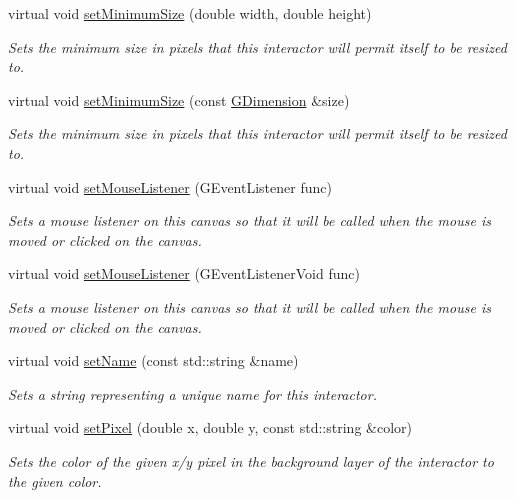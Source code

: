 \begin{DoxyCompactItemize}
virtual void \mbox{\hyperlink{classGInteractor_a0cf428e207b7f22cc08138a90b1b87b2}{set\+Minimum\+Size}} (double width, double height)
\begin{DoxyCompactList}\small\item\em Sets the minimum size in pixels that this interactor will permit itself to be resized to. \end{DoxyCompactList}\item 
virtual void \mbox{\hyperlink{classGInteractor_a3b1046117ac6cb7abe467e00ba8a81f4}{set\+Minimum\+Size}} (const \mbox{\hyperlink{classGDimension}{G\+Dimension}} \&size)
\begin{DoxyCompactList}\small\item\em Sets the minimum size in pixels that this interactor will permit itself to be resized to. \end{DoxyCompactList}\item 
virtual void \mbox{\hyperlink{classGCanvas_a37d8dbc943f59920f705b0104f60bde2}{set\+Mouse\+Listener}} (G\+Event\+Listener func)
\begin{DoxyCompactList}\small\item\em Sets a mouse listener on this canvas so that it will be called when the mouse is moved or clicked on the canvas. \end{DoxyCompactList}\item 
virtual void \mbox{\hyperlink{classGCanvas_aea7f647ea62d59f71b5fad6aa65eeaf9}{set\+Mouse\+Listener}} (G\+Event\+Listener\+Void func)
\begin{DoxyCompactList}\small\item\em Sets a mouse listener on this canvas so that it will be called when the mouse is moved or clicked on the canvas. \end{DoxyCompactList}\item 
virtual void \mbox{\hyperlink{classGInteractor_a9d3a2685df23b5e7cbf59c19c4a1f9b5}{set\+Name}} (const std\+::string \&name)
\begin{DoxyCompactList}\small\item\em Sets a string representing a unique name for this interactor. \end{DoxyCompactList}\item 
virtual void \mbox{\hyperlink{classGDrawingSurface_a09f9640e4ff7388dcfc391efd88d2415}{set\+Pixel}} (double x, double y, const std\+::string \&color)
\begin{DoxyCompactList}\small\item\em Sets the color of the given x/y pixel in the background layer of the interactor to the given color. \end{DoxyCompactList}\item 

\end{DoxyCompactItemize}
